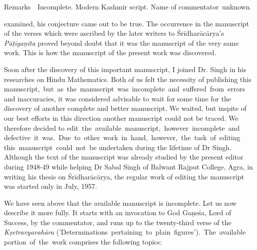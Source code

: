\documentclass[10pt, openany]{book}
\begin{document}
{\setlength{\parindent}{2em}
 {Remarks\;\textemdash ~~Incomplete. \;Modern \;Kashmir \;script. \;Name \;of \;commentator \,unknown.}}

\vspace{0.3cm}

\afterpage{\fancyhead[LE,RO]{\thepage}}
\cfoot{}

\newpage
{}
\setcounter{page}{2}

{examined, his conjecture came out to be true. The occurrence in the manuscript of the verses which were ascribed}
{by the later writers to Śrīdharācārya's {\textit{Pāṭīgaṇita}} proved}
{beyond doubt that it was the manuscript of the very same}
{work. This is how the manuscript of the present work was}
{discovered.}

\vspace{0.3cm} {Soon after the discovery of this important manuscript,}
{I joined Dr. Singh in his researches on Hindu Mathematics.}
{Both of us felt the necessity of publishing this manuscript, \,but}
\,{as \,the \,manuscript \,was \,incomplete \,and \,suffered \,from \,errors}
\,{and inaccuracies, it was considered advisable to wait for some}
{time for the discovery of another complete and better manuscript.}
{We waited, but inspite of our best efforts in this}
{direction another manuscript could not be traced. We therefore}
{decided to edit \,the \,available \,manuscript, \,however \,incomplete}
\,{and \,defective \,it \,was. \,Due \,to \,other \,work \,in \,hand,}
\,{however, \,the \,task \,of \,editing \,this \,manuscript \,could \,not}
\,{be undertaken during the lifetime of Dr Singh. Although}
{the text of the manuscript was already studied by the present}
{editor during 1948-49 while helping Dr Sabal Singh of}
{Balwant Rajput College, Agra, in writing his thesis on}
{Śrīdharācārya, the regular work of editing the manuscript}
{was started only in July, 1957.}

\vspace{0.3cm} {We have seen above that the available manuscript is}
{incomplete. Let us now describe it more fully. It starts with}
{an invocation to God Gaṇeśa, Lord of Success, by the commentator,}
{and runs up to the twenty-third verse of the }
{\textit{Kṣetravyavahāra} ('Determinations \,pertaining \,to \,plain \,figures'). \,The}
\,{available \,portion \,of \,the \,work comprises the following topics:}
\end{document}
